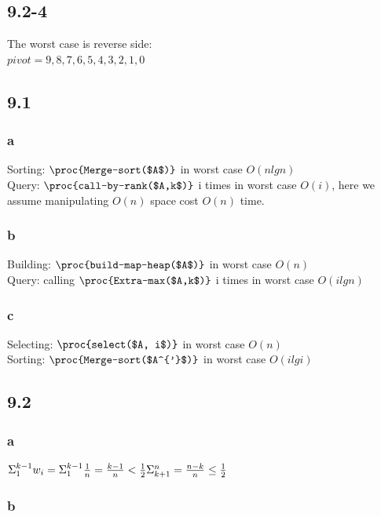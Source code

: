\documentclass[]{article}
\begin{document}
\subsection{9.2-4}
The worst case is reverse side:\\
$pivot = {9,8,7,6,5,4,3,2,1,0}$

\subsection{9.1}
\subsubsection{a}

Sorting: $\proc{Merge-sort($A$)}$ in worst case $O(nlgn)$\\
Query: $\proc{call-by-rank($A,k$)}$ i times in worst case $O(i)$, here we assume manipulating $O(n)$ space cost $O(n)$ time.

\subsubsection{b}

Building: $\proc{build-map-heap($A$)}$ in worst case $O(n)$\\
Query: calling $\proc{Extra-max($A,k$)}$ i times in worst case $O(ilgn)$

\subsubsection{c}

Selecting: $\proc{select($A, i$)}$ in worst case $O(n)$\\
Sorting:  $\proc{Merge-sort($A^{'}$)}$ in worst case $O(ilgi)$

\subsection{9.2}
\subsubsection{a}

$\Sigma_{1}^{k-1} w_{i} = \Sigma_{1}^{k-1} \frac{1}{n} = \frac{k-1}{n} < \frac{1}{2}\\
\Sigma_{k+1}^{n} = \frac{n-k}{n} \le \frac{1}{2}$

\subsubsection{b}
\end{document}
